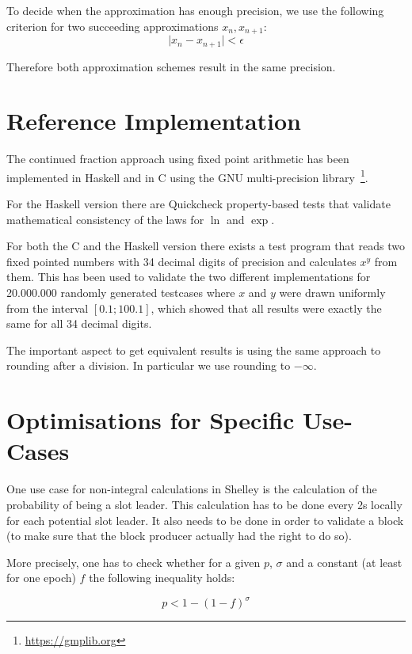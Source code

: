 \documentclass[11pt,a4paper,dvipsnames]{article}
\theoremstyle{definition}
\theoremstyle{definition}
\begin{document}
To decide when the approximation has enough precision, we use the following
criterion for two succeeding approximations $x_{n}, x_{n+1}$:
\begin{equation*}
  \vert x_{n} - x_{n+1}\vert < \epsilon
\end{equation*}

Therefore both approximation schemes result in the same precision.

\section{Reference Implementation}
\label{sec:refer-impl}

The continued fraction approach using fixed point arithmetic has been
implemented in Haskell and in C using the GNU multi-precision
library~\footnote{\url{https://gmplib.org}}.

For the Haskell version there are Quickcheck property-based tests that validate
mathematical consistency of the laws for $\ln$ and $\exp$.

For both the C and the Haskell version there exists a test program that reads
two fixed pointed numbers with 34 decimal digits of precision and calculates
$x^{y}$ from them. This has been used to validate the two different
implementations for 20.000.000 randomly generated testcases where $x$ and $y$
were drawn uniformly from the interval $[0.1; 100.1]$, which showed that all
results were exactly the same for all 34 decimal digits.

The important aspect to get equivalent results is using the same approach to
rounding after a division. In particular we use rounding to $-\infty$.

\section{Optimisations for Specific Use-Cases}
\label{sec:optim-spec-use}

One use case for non-integral calculations in Shelley is the calculation of the
probability of being a slot leader. This calculation has to be done every 2s
locally for each potential slot leader. It also needs to be done in order to
validate a block (to make sure that the block producer actually had the right to
do so).

More precisely, one has to check whether for a given $p$, $\sigma$ and a
constant (at least for one epoch) $f$ the following inequality holds:

\begin{equation*}
  p < 1 - {(1 - f)}^{\sigma}
\end{equation*}
\end{document}

